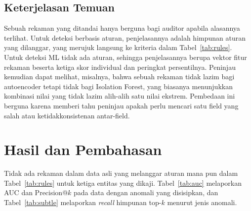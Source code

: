 \documentclass[conference]{IEEEtran}
\begin{document}
\subsection{Keterjelasan Temuan}
Sebuah rekaman yang ditandai hanya berguna bagi auditor apabila alasannya terlihat. Untuk deteksi berbasis aturan, penjelasannya adalah himpunan aturan yang dilanggar, yang merujuk langsung ke kriteria dalam Tabel~\ref{tab:rules}. Untuk deteksi ML tidak ada aturan, sehingga penjelasannya berupa vektor fitur rekaman beserta ketiga skor individual dan peringkat persentilnya. Peninjau kemudian dapat melihat, misalnya, bahwa sebuah rekaman tidak lazim bagi autoencoder tetapi tidak bagi Isolation Forest, yang biasanya menunjukkan kombinasi nilai yang tidak lazim alih-alih satu nilai ekstrem. Pembedaan ini berguna karena memberi tahu peninjau apakah perlu mencari satu field yang salah atau ketidakkonsistenan antar-field.

\section{Hasil dan Pembahasan}\label{sec:results}
Tidak ada rekaman dalam data asli yang melanggar aturan mana pun dalam Tabel~\ref{tab:rules} untuk ketiga entitas yang dikaji. Tabel~\ref{tab:auc} melaporkan AUC dan Precision@$k$ pada data dengan anomali yang disisipkan, dan Tabel~\ref{tab:subtle} melaporkan \textit{recall} himpunan top-$k$ menurut jenis anomali.
\end{document}
